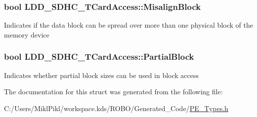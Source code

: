\subsubsection[{Misalign\+Block}]{\setlength{\rightskip}{0pt plus 5cm}bool L\+D\+D\+\_\+\+S\+D\+H\+C\+\_\+\+T\+Card\+Access\+::\+Misalign\+Block}\label{struct_l_d_d___s_d_h_c___t_card_access_aa56e65353fd03ffdbd8cc8d19537b621}
Indicates if the data block can be spread over more than one physical block of the memory device \hypertarget{struct_l_d_d___s_d_h_c___t_card_access_a9d78668915e934548a04351b20ec2d0a}{}
\subsubsection[{Partial\+Block}]{\setlength{\rightskip}{0pt plus 5cm}bool L\+D\+D\+\_\+\+S\+D\+H\+C\+\_\+\+T\+Card\+Access\+::\+Partial\+Block}\label{struct_l_d_d___s_d_h_c___t_card_access_a9d78668915e934548a04351b20ec2d0a}
Indicates whether partial block sizes can be used in block access 

The documentation for this struct was generated from the following file\+:\begin{DoxyCompactItemize}
\item 
C\+:/\+Users/\+Mikl\+Pikl/workspace.\+kds/\+R\+O\+B\+O/\+Generated\+\_\+\+Code/\hyperlink{_p_e___types_8h}{P\+E\+\_\+\+Types.\+h}\end{DoxyCompactItemize}
